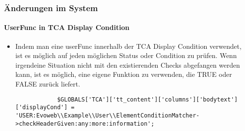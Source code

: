 \begin{frame}[fragile]
	\frametitle{Änderungen im System}
	\framesubtitle{UserFunc in TCA Display Condition}

	\begin{itemize}
		\item Indem man eine userFunc innerhalb der TCA Display Condition verwendet, ist es möglich auf jeden möglichen Status oder Condition zu prüfen. Wenn irgendeine Situation nicht mit den existierenden Checks abgefangen werden kann, ist es möglich, eine eigene Funktion zu verwenden, die TRUE oder FALSE zurück liefert.

		\begin{lstlisting}
			$GLOBALS['TCA']['tt_content']['columns']['bodytext']['displayCond'] = 'USER:Evoweb\\Example\\User\\ElementConditionMatcher->checkHeaderGiven:any:more:information';
		\end{lstlisting}

	\end{itemize}

\end{frame}



